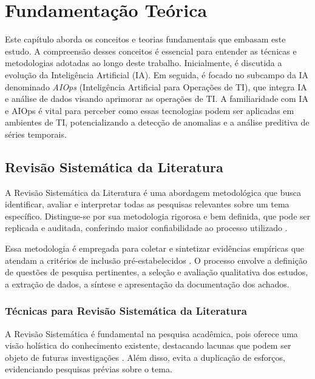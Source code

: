 \chapter{Fundamentação Teórica}
\label{cap_fundamentacao-teorica}

Este capítulo aborda os conceitos e teorias fundamentais que embasam este estudo. A compreensão desses conceitos é essencial para entender as técnicas e metodologias adotadas ao longo deste trabalho. Inicialmente, é discutida a evolução da Inteligência Artificial (IA). Em seguida, é focado no subcampo da IA denominado \textit{AIOps} (Inteligência Artificial para Operações de TI), que integra IA e análise de dados visando aprimorar as operações de TI. A familiaridade com IA e AIOps é vital para perceber como essas tecnologias podem ser aplicadas em ambientes de TI, potencializando a detecção de anomalias e a análise preditiva de séries temporais.

\section{Revisão Sistemática da Literatura}
\label{cap_revisao-sistematica}

A Revisão Sistemática da Literatura é uma abordagem metodológica que busca identificar, avaliar e interpretar todas as pesquisas relevantes sobre um tema específico. Distingue-se por sua metodologia rigorosa e bem definida, que pode ser replicada e auditada, conferindo maior confiabilidade ao processo utilizado \cite{tranfield2003systematic}.

Essa metodologia é empregada para coletar e sintetizar evidências empíricas que atendam a critérios de inclusão pré-estabelecidos \cite{kitchenham2007guidelines}. O processo envolve a definição de questões de pesquisa pertinentes, a seleção e avaliação qualitativa dos estudos, a extração de dados, a síntese e apresentação da documentação dos achados.

\subsection{Técnicas para Revisão Sistemática da Literatura}
\label{subcap_tec_rev-sistematica}

A Revisão Sistemática é fundamental na pesquisa acadêmica, pois oferece uma visão holística do conhecimento existente, destacando lacunas que podem ser objeto de futuras investigações \cite{petticrew2006systematic}. Além disso, evita a duplicação de esforços, evidenciando pesquisas prévias sobre o tema.

